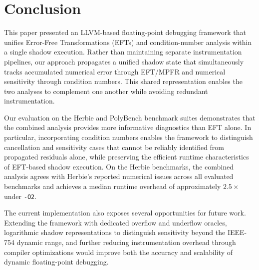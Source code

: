 \section{Conclusion}

This paper presented an LLVM-based floating-point debugging framework that unifies Error-Free Transformations (EFTs) and condition-number analysis within a single shadow execution. Rather than maintaining separate instrumentation pipelines, our approach propagates a unified shadow state that simultaneously tracks accumulated numerical error through EFT/MPFR and numerical sensitivity through condition numbers. This shared representation enables the two analyses to complement one another while avoiding redundant instrumentation.

Our evaluation on the Herbie and PolyBench benchmark suites demonstrates that the combined analysis provides more informative diagnostics than EFT alone. In particular, incorporating condition numbers enables the framework to distinguish cancellation and sensitivity cases that cannot be reliably identified from propagated residuals alone, while preserving the efficient runtime characteristics of EFT-based shadow execution. On the Herbie benchmarks, the combined analysis agrees with Herbie's reported numerical issues across all evaluated benchmarks and achieves a median runtime overhead of approximately $2.5\times$ under \texttt{-O2}.

The current implementation also exposes several opportunities for future work. Extending the framework with dedicated overflow and underflow oracles, logarithmic shadow representations to distinguish sensitivity beyond the IEEE-754 dynamic range, and further reducing instrumentation overhead through compiler optimizations would improve both the accuracy and scalability of dynamic floating-point debugging.